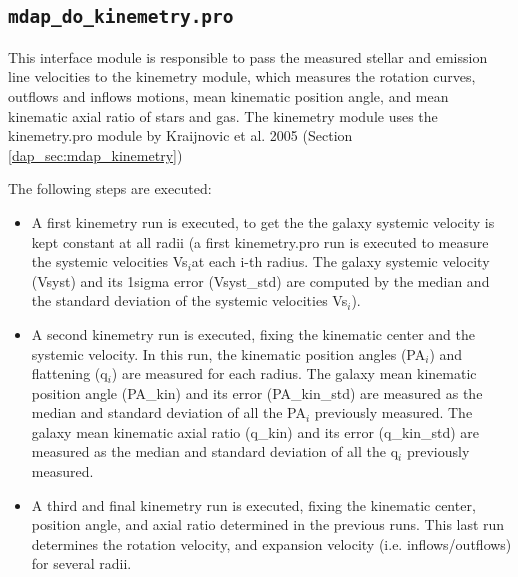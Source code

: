 \subsection{{\tt mdap\_do\_kinemetry.pro}}
\label{dap_sec:mdap_do_kinemetry}

This interface module is responsible to pass the measured stellar and
emission line velocities to the kinemetry module, which measures the
rotation curves, outflows and inflows motions, mean kinematic position
angle, and mean kinematic axial ratio of stars and gas. The kinemetry
module uses the kinemetry.pro module by Kraijnovic et al. 2005
(Section \ref{dap_sec:mdap_kinemetry})

The following steps are executed:

 \begin{itemize}



 \item A first kinemetry run is executed, to get the the galaxy
   systemic velocity is kept constant at all radii (a first
   kinemetry.pro run is executed to measure the systemic velocities
   Vs$_i$at each i-th radius. The galaxy systemic velocity (Vsyst) and
   its 1sigma error (Vsyst\_std) are computed by the median and the
   standard deviation of the systemic velocities Vs$_i$).

 \item A second kinemetry run is executed, fixing the kinematic center
   and the systemic velocity. In this run, the kinematic position
   angles (PA$_i$) and flattening (q$_i$) are measured for each
   radius. The galaxy mean kinematic position angle (PA\_kin) and its
   error (PA\_kin\_std) are measured as the median and standard
   deviation of all the PA$_i$ previously measured.  The galaxy mean
   kinematic axial ratio (q\_kin) and its error (q\_kin\_std) are
   measured as the median and standard deviation of all the q$_i$
   previously measured.

\item A third and final kinemetry run is executed, fixing the
  kinematic center, position angle, and axial ratio determined in the
  previous runs. This last run determines the rotation velocity, and
  expansion velocity (i.e. inflows/outflows) for several radii.

\end{itemize}


